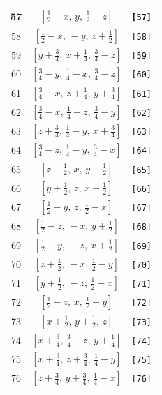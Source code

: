 \documentclass[fleqn,8pt]{jsarticle}
\begin{document}
\begin{longtable}{ccc}
57 & $\left[ \frac{1}{2} - x,\, y,\, \frac{1}{2} - z \right]$ & {\tt [57]} \\ \hline
58 & $\left[ \frac{1}{2} - x,\, - y,\, z + \frac{1}{2} \right]$ & {\tt [58]} \\ \hline
59 & $\left[ y + \frac{3}{4},\, x + \frac{1}{4},\, \frac{3}{4} - z \right]$ & {\tt [59]} \\ \hline
60 & $\left[ \frac{3}{4} - y,\, \frac{1}{4} - x,\, \frac{3}{4} - z \right]$ & {\tt [60]} \\ \hline
61 & $\left[ \frac{3}{4} - x,\, z + \frac{1}{4},\, y + \frac{3}{4} \right]$ & {\tt [61]} \\ \hline
62 & $\left[ \frac{3}{4} - x,\, \frac{1}{4} - z,\, \frac{3}{4} - y \right]$ & {\tt [62]} \\ \hline
63 & $\left[ z + \frac{3}{4},\, \frac{1}{4} - y,\, x + \frac{3}{4} \right]$ & {\tt [63]} \\ \hline
64 & $\left[ \frac{3}{4} - z,\, \frac{1}{4} - y,\, \frac{3}{4} - x \right]$ & {\tt [64]} \\ \hline
65 & $\left[ z + \frac{1}{2},\, x,\, y + \frac{1}{2} \right]$ & {\tt [65]} \\ \hline
66 & $\left[ y + \frac{1}{2},\, z,\, x + \frac{1}{2} \right]$ & {\tt [66]} \\ \hline
67 & $\left[ \frac{1}{2} - y,\, z,\, \frac{1}{2} - x \right]$ & {\tt [67]} \\ \hline
68 & $\left[ \frac{1}{2} - z,\, - x,\, y + \frac{1}{2} \right]$ & {\tt [68]} \\ \hline
69 & $\left[ \frac{1}{2} - y,\, - z,\, x + \frac{1}{2} \right]$ & {\tt [69]} \\ \hline
70 & $\left[ z + \frac{1}{2},\, - x,\, \frac{1}{2} - y \right]$ & {\tt [70]} \\ \hline
71 & $\left[ y + \frac{1}{2},\, - z,\, \frac{1}{2} - x \right]$ & {\tt [71]} \\ \hline
72 & $\left[ \frac{1}{2} - z,\, x,\, \frac{1}{2} - y \right]$ & {\tt [72]} \\ \hline
73 & $\left[ x + \frac{1}{2},\, y + \frac{1}{2},\, z \right]$ & {\tt [73]} \\ \hline
74 & $\left[ x + \frac{3}{4},\, \frac{3}{4} - z,\, y + \frac{1}{4} \right]$ & {\tt [74]} \\ \hline
75 & $\left[ x + \frac{3}{4},\, z + \frac{3}{4},\, \frac{1}{4} - y \right]$ & {\tt [75]} \\ \hline
76 & $\left[ z + \frac{3}{4},\, y + \frac{3}{4},\, \frac{1}{4} - x \right]$ & {\tt [76]} \\ \hline

\end{longtable}
\end{document}
